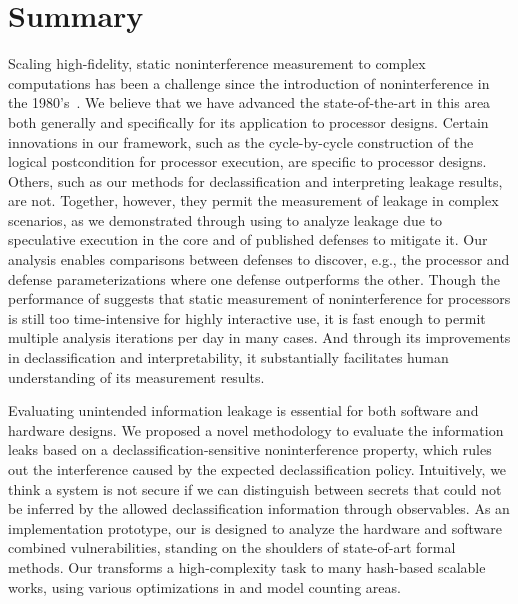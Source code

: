 \section{Summary}
\label{dinome:sec:summary}

Scaling high-fidelity, static noninterference measurement to complex
computations has been a challenge since the introduction of
noninterference in the 1980's~\cite{goguen1982security}.  We believe
that we have advanced the state-of-the-art in this area both generally
and specifically for its application to processor designs.  Certain
innovations in our \thirdsysname framework, such as the cycle-by-cycle
construction of the logical postcondition for processor execution, are
specific to processor designs.  Others, such as our methods for
declassification and interpreting leakage results, are not.  Together,
however, they permit the measurement of leakage in complex scenarios,
as we demonstrated through using \thirdsysname to analyze leakage due to
speculative execution in the \boom core and of published defenses to
mitigate it.  Our analysis enables comparisons between defenses to
discover, e.g., the processor and defense parameterizations where one
defense outperforms the other.  Though the performance of \thirdsysname
suggests that static measurement of noninterference for processors is
still too time-intensive for highly interactive use, it is fast enough
to permit multiple analysis iterations per day in many cases.  And
through its improvements in declassification and interpretability, it
substantially facilitates human understanding of its measurement
results.

\iffalse
Evaluating unintended information leakage is essential for both software
and hardware designs.  We proposed a novel methodology to
evaluate the information leaks based on a declassification-sensitive
noninterference property, which rules out the interference caused by
the expected declassification policy.  Intuitively, we think a system
is not secure if we can distinguish between secrets that could not be
inferred by the allowed declassification information through
observables. As an implementation prototype, our \thirdsysname is designed
to analyze the hardware and software combined vulnerabilities, standing
on the shoulders of state-of-art formal methods. Our \thirdsysname
transforms a high-complexity task to many hash-based scalable works,
using various optimizations in \sat and model counting areas.

